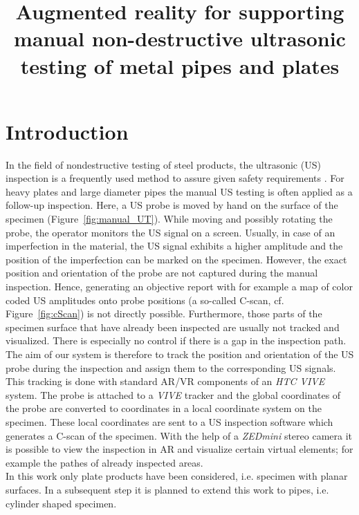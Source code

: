 \documentclass{VRARWorkshop}
\title{Augmented reality for supporting manual non-destructive ultrasonic testing of metal pipes and plates}
\begin{document}
\section{Introduction}

In the field of nondestructive testing of steel products, the ultrasonic (US) inspection is a frequently used method to assure given safety requirements \cite{deutsch_zfp_2010} \cite{moles_introduction_2004} \cite{olympus_Grundlagen}.
For heavy plates and large diameter pipes the manual US testing is often applied as a follow-up inspection. Here, a US probe is moved by hand on the surface of the specimen (Figure~\ref{fig:manual_UT}).
While moving and possibly rotating the probe, the operator monitors the US signal on a screen.
Usually, in case of an imperfection in the material, the US signal exhibits a higher amplitude and the position of the imperfection can be marked on the specimen.
However, the exact position and orientation of the probe are not captured during the manual inspection.
Hence, generating an objective report with for example a map of color coded US amplitudes onto probe positions (a so-called C-scan, cf. Figure~\ref{fig:cScan}) is not directly possible.
Furthermore, those parts of the specimen surface that have already been inspected are usually not tracked and visualized.
There is especially no control if there is a gap in the inspection path. \\
The aim of our system is therefore to track the position and orientation of the US probe during the inspection and assign them to the corresponding US signals.
This tracking is done with standard AR/VR components of an \textit{HTC VIVE} system.
The probe is attached to a \textit{VIVE} tracker and the global coordinates of the probe are converted to coordinates in a local coordinate system on the specimen. These local coordinates are sent to a US inspection software which generates a C-scan of the specimen. 
With the help of a \textit{ZEDmini} stereo camera it is possible to view the inspection in AR and visualize certain virtual elements; for example the pathes of already inspected areas. \\
In this work only plate products have been considered, i.e. specimen with planar surfaces.
In a subsequent step it is planned to extend this work to pipes, i.e. cylinder shaped specimen.
\end{document}
